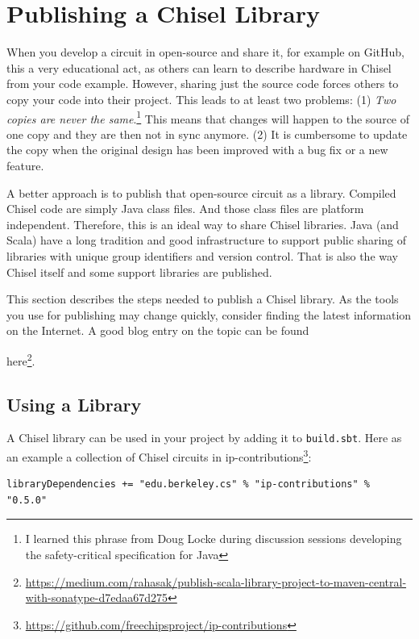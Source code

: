 \documentclass[%
    10pt,
    headinclude, footexclude,
    openright, %
    notitlepage,
    cleardoubleempty,
    headsepline,
    pointlessnumbers,
    bibtotoc, idxtotoc,
    ]{scrbook}
\newif\ifbook
\newcommand{\code}[1]{{\small{\texttt{#1}}}}
\newcommand{\myref}[2]{\href{#1}{#2}}
\renewcommand{\myref}[2]{{#2}{\footnote{\url{#1}}}}
\begin{document}
\section{Publishing a Chisel Library}

When you develop a circuit in open-source and share it, for example on GitHub,
this a very educational act, as others can learn to describe hardware in Chisel from your code example.
However, sharing just the source code forces others to copy your code into their
project. This leads to at least two problems: (1) \emph{Two copies are never the
same}.\footnote{I learned this phrase from Doug Locke during discussion sessions
developing the safety-critical specification for Java} This means that changes will
happen to the source of one copy and they are then not in sync anymore.
(2) It is cumbersome to update the copy when the original design has been improved
with a bug fix or a new feature.

A better approach is to publish that open-source circuit as a library.
Compiled Chisel code are simply Java class files. And those class files are
platform independent. Therefore, this is an ideal way to share Chisel libraries.
Java (and Scala) have a long tradition and good infrastructure to support
public sharing of libraries with unique group identifiers and version control.
That is also the way Chisel itself and some support libraries are published.

This section describes the steps needed to publish a Chisel library. As the tools you
use for publishing may change quickly, consider finding the latest information on the
Internet. A good blog entry on the topic can be found
\ifbook
\myref{https://medium.com/rahasak/}{here}.
\else
\myref{https://medium.com/rahasak/publish-scala-library-project-to-maven-central-with-sonatype-d7edaa67d275}{here}.
\fi

\subsection{Using a Library}

A Chisel library can be used in your project by adding it to \code{build.sbt}. Here as an
example a collection of Chisel circuits in \myref{https://github.com/freechipsproject/ip-contributions}{ip-contributions}:

\begin{verbatim}
libraryDependencies += "edu.berkeley.cs" % "ip-contributions" % "0.5.0"
\end{verbatim}
\end{document}
